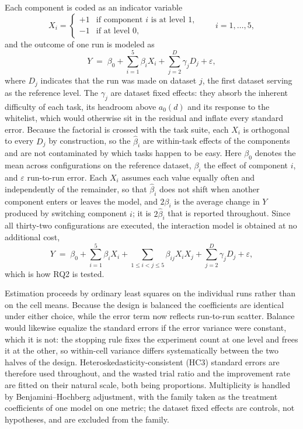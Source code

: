 \documentclass[11pt]{article}
\begin{document}
Each component is coded as an indicator variable
\begin{equation}
X_i = \begin{cases} +1 & \text{if component } i \text{ is at level } 1,\\ -1 & \text{if at level } 0,\end{cases}
\qquad i = 1,\ldots,5,
\label{eq:coding}
\end{equation}
and the outcome of one run is modeled as
\begin{equation}
Y \;=\; \beta_0 + \sum_{i=1}^{5}\beta_i X_i + \sum_{j=2}^{D}\gamma_j D_j + \varepsilon ,
\label{eq:regression}
\end{equation}
where $D_j$ indicates that the run was made on dataset $j$, the first dataset serving as the reference level. The $\gamma_j$ are dataset fixed effects: they absorb the inherent difficulty of each task, its headroom above $a_0(d)$ and its response to the whitelist, which would otherwise sit in the residual and inflate every standard error. Because the factorial is crossed with the task suite, each $X_i$ is orthogonal to every $D_j$ by construction, so the $\hat\beta_i$ are within-task effects of the components and are not contaminated by which tasks happen to be easy. Here $\beta_0$ denotes the mean across configurations on the reference dataset, $\beta_i$ the effect of component $i$, and $\varepsilon$ run-to-run error. Each $X_i$ assumes each value equally often and independently of the remainder, so that $\hat\beta_i$ does not shift when another component enters or leaves the model, and $2\beta_i$ is the average change in $Y$ produced by switching component $i$; it is $2\hat\beta_i$ that is reported throughout. Since all thirty-two configurations are executed, the interaction model is obtained at no additional cost,
\begin{equation}
Y \;=\; \beta_0 + \sum_{i=1}^{5}\beta_i X_i + \sum_{1\le i<j\le 5}\beta_{ij}X_iX_j + \sum_{j=2}^{D}\gamma_j D_j + \varepsilon ,
\label{eq:interaction}
\end{equation}
which is how RQ2 is tested.

Estimation proceeds by ordinary least squares on the individual runs rather than on the cell means. Because the design is balanced the coefficients are identical under either choice, while the error term now reflects run-to-run scatter. Balance would likewise equalize the standard errors if the error variance were constant, which it is not: the stopping rule fixes the experiment count at one level and frees it at the other, so within-cell variance differs systematically between the two halves of the design. Heteroskedasticity-consistent (HC3) standard errors are therefore used throughout, and the wasted trial ratio and the improvement rate are fitted on their natural scale, both being proportions. Multiplicity is handled by Benjamini--Hochberg adjustment, with the family taken as the treatment coefficients of one model on one metric; the dataset fixed effects are controls, not hypotheses, and are excluded from the family.
\end{document}

